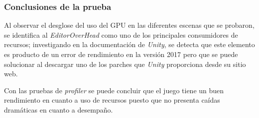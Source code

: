 \subsubsection{Conclusiones de la prueba}
Al observar el desglose del uso del GPU en las diferentes escenas que se 
probaron, se identifica al \textit{EditorOverHead} como uno de los principales 
consumidores de recursos; investigando en la documentación de \textit{Unity}, 
se detecta que este elemento es producto de un error de rendimiento en la 
versión 2017 pero que se puede solucionar al descargar uno de los parches que 
\textit{Unity} proporciona desde su sitio web.
\\
\par
Con las pruebas de \textit{profiler} se puede concluir que el juego tiene un buen 
rendimiento en cuanto a uso de recursos puesto que no presenta caídas 
dramáticas en cuanto a desempaño.




